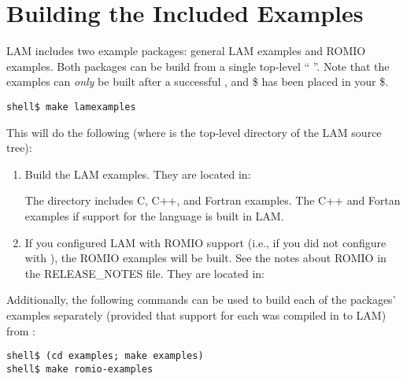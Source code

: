 
\section{Building the Included Examples}

LAM includes two example packages: general LAM examples and ROMIO
examples.  
%
%
Both packages can be build from a single top-level ``
''.  
%
%
Note that the examples can {\em only} be built after a successful
 , and \$ has been
placed in your \$.

\lstset{style=lam-cmdline}
\begin{lstlisting}
shell$ make lamexamples
\end{lstlisting}
%
This will do the following (where  is the top-level directory of
the LAM source tree):

\begin{enumerate}
\item Build the LAM examples.  They are located in:


     The  directory includes C, C++, and Fortran
     examples.  The C++ and Fortan examples if support for the
     language is built in LAM.

\item If you configured LAM with ROMIO support (i.e., if you did not
     configure with ), the ROMIO examples will be
     built.  See the notes about ROMIO in the RELEASE\_\-NOTES file.
     They are located in:

\end{enumerate}

\noindent Additionally, the following commands can be used to build
each of the packages' examples separately (provided that support for
each was compiled in to LAM) from :

\lstset{style=lam-cmdline}
\begin{lstlisting}
shell$ (cd examples; make examples)
shell$ make romio-examples
\end{lstlisting}
